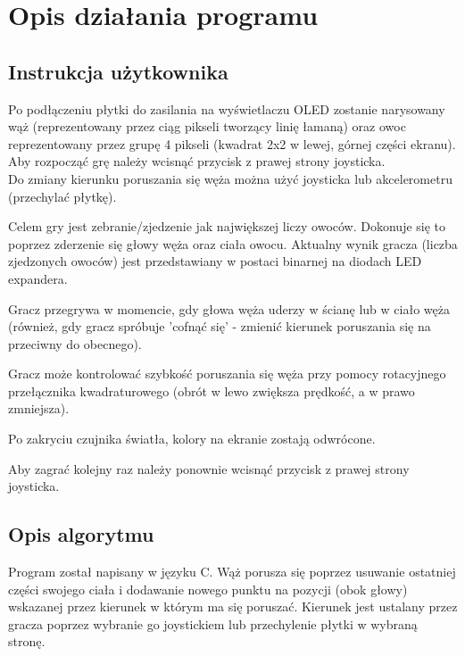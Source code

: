 \documentclass{classrep}
\begin{document}
	\section{Opis działania programu}
	
		\subsection{Instrukcja użytkownika}
		Po podłączeniu płytki do zasilania na wyświetlaczu OLED zostanie narysowany wąż (reprezentowany przez ciąg pikseli tworzący linię łamaną) oraz owoc reprezentowany przez grupę 4 pikseli (kwadrat 2x2 w lewej, górnej części ekranu).\\
		
		
		Aby rozpocząć grę należy wcisnąć przycisk z prawej strony joysticka.\\
		
		
		Do zmiany kierunku poruszania się węża można użyć joysticka lub akcelerometru (przechylać płytkę).
		
		
		Celem gry jest zebranie/zjedzenie jak największej liczy owoców. Dokonuje się to poprzez zderzenie się głowy węża oraz ciała owocu. Aktualny wynik gracza (liczba zjedzonych owoców) jest przedstawiany w postaci binarnej na diodach LED expandera.
		
		
		Gracz przegrywa w momencie, gdy głowa węża uderzy w ścianę lub w ciało węża (również, gdy gracz spróbuje 'cofnąć się' - zmienić kierunek poruszania się na przeciwny do obecnego).
		
		
		Gracz może kontrolować szybkość poruszania się węża przy pomocy rotacyjnego przełącznika kwadraturowego (obrót w lewo zwiększa prędkość, a w prawo zmniejsza).
		
		
		Po zakryciu czujnika światła, kolory na ekranie zostają odwrócone.
		
		
		Aby zagrać kolejny raz należy ponownie wcisnąć przycisk z prawej strony joysticka.
		
		
		
		\subsection{Opis algorytmu}
		Program został napisany w języku C. Wąż porusza się poprzez usuwanie ostatniej części swojego ciała i dodawanie nowego punktu na pozycji (obok głowy) wskazanej przez kierunek w którym ma się poruszać. Kierunek jest ustalany przez gracza poprzez wybranie go joystickiem lub przechylenie płytki w wybraną stronę.
		
\end{document}
